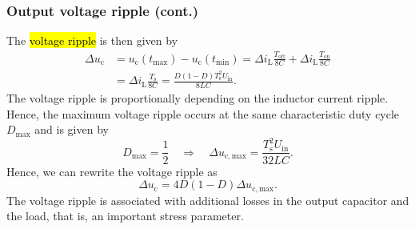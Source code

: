 \begin{frame}
    \frametitle{Output voltage ripple (cont.)}
    The \hl{voltage ripple} is then given by
    \begin{equation}
        \begin{split}
            \Delta u_\mathrm{c} &= u_\mathrm{c}(t_\mathrm{max}) - u_\mathrm{c}(t_\mathrm{min}) = \Delta i_\mathrm{L}\frac{T_\mathrm{off}}{8C} + \Delta i_\mathrm{L}\frac{T_\mathrm{on}}{8C}\\
                                &= \Delta i_\mathrm{L}\frac{T_\mathrm{s}}{8C} = \frac{D(1-D)T_\mathrm{s}^2U_\mathrm{in}}{8LC}.
        \end{split}
    \end{equation}
    The voltage ripple is proportionally depending on the inductor current ripple. Hence, the maximum voltage ripple occurs at the same characteristic duty cycle $D_\mathrm{max}$ and is given by
    \begin{equation}
        D_\mathrm{max}=\frac{1}{2} \quad \Rightarrow \quad \Delta u_\mathrm{c, max} =  \frac{T_\mathrm{s}^2U_\mathrm{in}}{32 LC}.
    \end{equation}
    Hence, we can rewrite the voltage ripple as
    \begin{equation}
        \Delta u_\mathrm{c} =   4D(1-D)\Delta u_\mathrm{c, max}.
    \end{equation}
    The voltage ripple is associated with additional losses in the output capacitor and the load, that is, an important stress parameter.
\end{frame}

